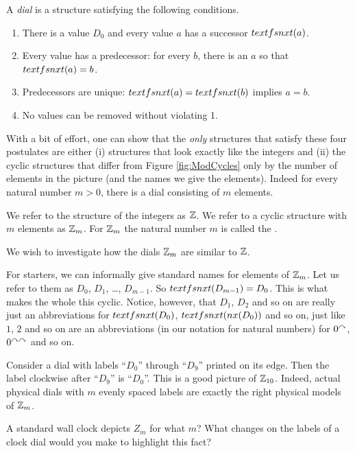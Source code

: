 \begin{defn}
	A \emph{dial} is a structure satisfying the following conditions.
\begin{enumerate}
	\item There is a value $D_0$ and every value $a$ has a successor $\mathord{textfs{nxt}}(a)$.
	\item Every value has a predecessor: for every $b$, there is an $a$ so that $\mathord{textfs{nxt}}(a) = b$.
	\item Predecessors are unique: $\mathord{textfs{nxt}}(a) = \mathord{textfs{nxt}}(b)$ implies $a=b$.
	\item No values can be removed without violating 1.
\end{enumerate}
\end{defn}

With a bit of effort, one can show that the \emph{only} structures that satisfy these four postulates are either (i) structures that look exactly like the integers and (ii) the cyclic structures that differ from Figure \ref{fig:ModCycles} only by the number of elements in the picture (and the names we give the elements). Indeed for every natural number $m>0$, there is a dial consisting of $m$ elements.

\begin{defn}
	We refer to the structure of the integers as ${\mathbb Z}$. We refer to a cyclic structure with $m$ elements as ${\mathbb Z}_m$. For ${\mathbb Z}_m$ the natural number $m$ is called the .
\end{defn}

We wish to investigate how the dials ${\mathbb Z}_m$ are similar to ${\mathbb Z}$. 

For starters, we can informally give standard names for elements of ${\mathbb Z}_m$. Let us refer to them as $D_0$, $D_1$, \ldots, $D_{m-1}$. So $\mathord{textfs{nxt}}(D_{m-1}) = D_0$. This is what makes the whole this cyclic. Notice, however, that $D_1$, $D_2$ and so on are really just an abbreviations for $\mathord{textfs{nxt}}(D_0)$, $\mathord{textfs{nxt}}(nx(D_0))$ and so on,  just like $1$, $2$ and so on are an abbreviations (in our notation for natural numbers) for $0^\curvearrowright$, $0^{\curvearrowright\curvearrowright}$ and so on.

\begin{example}
Consider a dial with labels ``$D_0$'' through ``$D_9$'' printed on its edge. Then the label clockwise after ``$D_9$'' is ``$D_0$''. This is a good picture of ${\mathbb Z}_{10}$. Indeed, actual physical dials with $m$ evenly spaced labels are exactly the right physical models of ${\mathbb Z}_m$.
\end{example}

\begin{exer}
	\begin{exercise}
		\item A standard wall clock depicts $Z_m$ for what $m$? What changes on the labels of a clock dial would you make to highlight this fact?
	\end{exercise}
\end{exer}   

